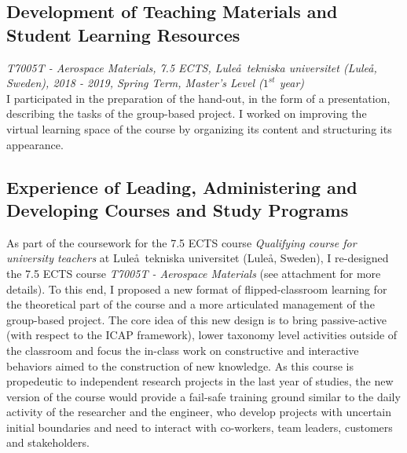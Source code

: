\documentclass[
  a4paper, 
]{fortysecondscv}
\begin{document}
\newpage
\makebacksidebar
\hrulefill\hspace{5pt}\textbf{\thepage}

\subsection{Development of Teaching Materials and Student Learning Resources}
\textit{T7005T - Aerospace Materials, 7.5 ECTS, Lule\aa\ tekniska universitet (Lule\aa, Sweden), 2018 - 2019, Spring Term, Master's Level ($1^{st}$ year)}\\
I participated in the preparation of the hand-out, in the form of a presentation, describing the tasks of the group-based project. I worked on improving the virtual learning space of the course by organizing its content and structuring its appearance.

\subsection{Experience of Leading, Administering and Developing Courses and Study Programs}
As part of the coursework for the 7.5 ECTS course \emph{Qualifying course for university teachers} at Lule\aa\ tekniska universitet (Lule\aa, Sweden), I re-designed the 7.5 ECTS course \textit{T7005T - Aerospace Materials} (see attachment for more details). To this end, I proposed a new format of flipped-classroom learning for the theoretical part of the course and a more articulated management of the group-based project. The core idea of this new design is to bring passive-active (with respect to the ICAP framework), lower taxonomy level activities outside of the classroom and focus the in-class work on constructive and interactive behaviors aimed to the construction of new knowledge. As this course is propedeutic to independent research projects in the last year of studies, the new version of the course would provide a fail-safe training ground similar to the daily activity of the researcher and the engineer, who develop projects with uncertain initial boundaries and need to interact with co-workers, team leaders, customers and stakeholders.
\end{document}
